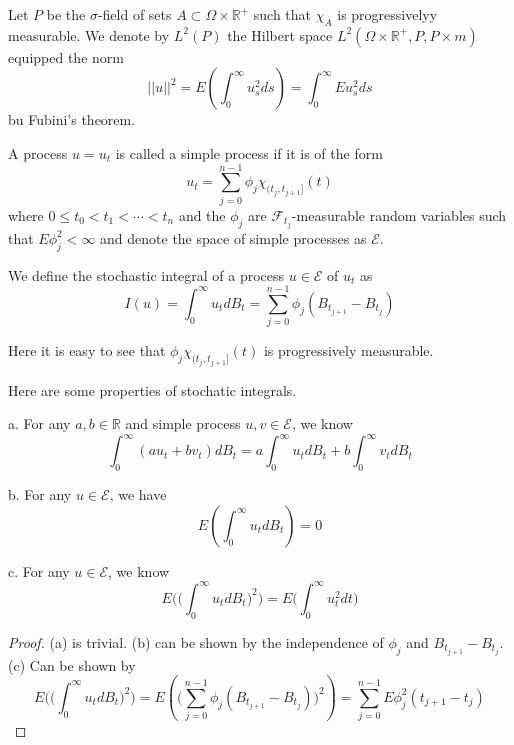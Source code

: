 \documentclass[lang=en, color=blue, ]{elegantbook}
\newcommand{\F}{\mathcal{F}}
\newcommand{\R}{\mathbb{R}}
\begin{document}
\begin{definition}
    Let $P$ be the $\sigma$-field of sets $A\subset \Omega \times \R^+$ such that $\chi_A$ is progressivelyy measurable. We denote by $L^2(P)$ the Hilbert space $L^2(\Omega\times \R^+, P, P\times m)$ equipped the norm
    \[
    ||u||^2 = E(\int_0^{\infty} u_s^2ds) = \int_0^{\infty}Eu_s^2 ds
    \]
    bu Fubini's theorem.
\end{definition}

\begin{definition}
    A process $u = u_t$ is called a simple process if it is of the form
    \[u_t = \sum\limits_{j=0}^{n-1}\phi_j \chi_{(t_j,t_{j+1}]}(t)\]
    where $0\leq t_0 < t_1 < \cdots < t_n$ and the $\phi_j$ are $\F_{t_j}$-measurable random variables such that $E\phi_j^2 < \infty$ and denote the space of simple processes as $\mathcal{E}$.\par
    We define the stochastic integral of a process $u\in \mathcal{E}$ of $u_t$ as
    \[
    I(u) = \int_0^{\infty} u_tdB_t = \sum\limits_{j=0}^{n-1}\phi_j(B_{t_{j+1}}-B_{t_j})
    \]
\end{definition}
Here it is easy to see that $\phi_j \chi_{(t_j,t_{j+1}]}(t)$ is progressively measurable.

\begin{proposition}
    Here are some properties of stochatic integrals.\par
    a. For any $a,b\in \R$ and simple process $u,v \in \mathcal{E}$, we know
    \[
    \int_0^{\infty}(au_t + bv_t)dB_t = a\int_0^{\infty}u_t dB_t + b\int_0^{\infty} v_tdB_t
    \]\par
    b. For any $u\in \mathcal{E}$, we have
    \[
    E(\int_0^\infty{u_t}dB_t) = 0
    \]\par
    c. For any $u\in\mathcal{E}$, we know
    \[
    E\Big(\Big(\int_0^{\infty} u_tdB_t\Big)^2\Big) = E\Big(\int_0^{\infty} u_t^2 dt\Big)
    \]
\end{proposition}
\begin{proof}
    (a) is trivial. (b) can be shown by the independence of $\phi_j$ and $B_{t_{j+1}}- B_{t_{j}}$. (c) Can be shown by
    \[
    E\Big(\Big(\int_0^{\infty} u_tdB_t\Big)^2\Big) = E(\Big(\sum\limits_{j=0}^{n-1} \phi_j (B_{t_{j+1}}- B_{t_j})\Big)^2) = \sum\limits_{j=0}^{n-1} E\phi_j^2(t_{j+1}-t_j)
    \]
\end{proof}
\end{document}

